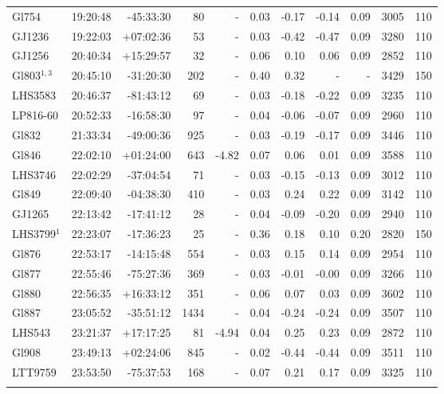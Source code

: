 \documentclass{aa}
\begin{document}
{\begin{longtable}{l r r r r r r r r r r}
Gl754 & 19:20:48 & -45:33:30 & 80 &    - & 0.03 & -0.17 & -0.14 & 0.09 & 3005 &  110 \\
GJ1236 & 19:22:03 & +07:02:36 & 53 &    - & 0.03 & -0.42 & -0.47 & 0.09 & 3280 &  110 \\
GJ1256 & 20:40:34 & +15:29:57 & 32 &    - & 0.06 & 0.10 & 0.06 & 0.09 & 2852 &  110 \\
Gl803$^{1,3}$ & 20:45:10 & -31:20:30 & 202 &    - & 0.40 & 0.32 & - & - & 3429 &  150 \\
LHS3583 & 20:46:37 & -81:43:12 & 69 &    - & 0.03 & -0.18 & -0.22 & 0.09 & 3235 &  110 \\
LP816-60 & 20:52:33 & -16:58:30 & 97 &    - & 0.04 & -0.06 & -0.07 & 0.09 & 2960 &  110 \\
Gl832 & 21:33:34 & -49:00:36 & 925 &    - & 0.03 & -0.19 & -0.17 & 0.09 & 3446 &  110 \\
Gl846 & 22:02:10 & +01:24:00 & 643 & -4.82 & 0.07 & 0.06 & 0.01 & 0.09 & 3588 &  110 \\
LHS3746 & 22:02:29 & -37:04:54 & 71 &    - & 0.03 & -0.15 & -0.13 & 0.09 & 3012 &  110 \\
Gl849 & 22:09:40 & -04:38:30 & 410 &    - & 0.03 & 0.24 & 0.22 & 0.09 & 3142 &  110 \\
GJ1265 & 22:13:42 & -17:41:12 & 28 &    - & 0.04 & -0.09 & -0.20 & 0.09 & 2940 &  110 \\
LHS3799$^1$ & 22:23:07 & -17:36:23 & 25 &    - & 0.36 & 0.18 & 0.10 & 0.20 & 2820 &  150 \\
Gl876 & 22:53:17 & -14:15:48 & 554 &    - & 0.03 & 0.15 & 0.14 & 0.09 & 2954 &  110 \\
Gl877 & 22:55:46 & -75:27:36 & 369 &    - & 0.03 & -0.01 & -0.00 & 0.09 & 3266 &  110 \\
Gl880 & 22:56:35 & +16:33:12 & 351 &    - & 0.06 & 0.07 & 0.03 & 0.09 & 3602 &  110 \\
Gl887 & 23:05:52 & -35:51:12 & 1434 &    - & 0.04 & -0.24 & -0.24 & 0.09 & 3507 &  110 \\
LHS543 & 23:21:37 & +17:17:25 & 81 & -4.94 & 0.04 & 0.25 & 0.23 & 0.09 & 2872 &  110 \\
Gl908 & 23:49:13 & +02:24:06 & 845 &    - & 0.02 & -0.44 & -0.44 & 0.09 & 3511 &  110 \\
LTT9759 & 23:53:50 & -75:37:53 & 168 &    - & 0.07 & 0.21 & 0.17 & 0.09 & 3325 &  110 \\
\label{table:full}
\end{longtable}
}
\end{document}

